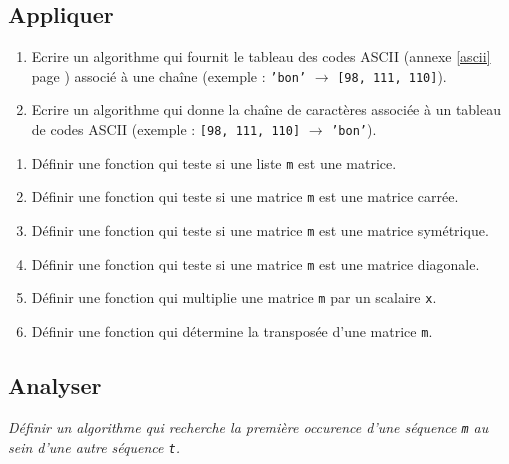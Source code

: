 \subsection{Appliquer}
\begin{td}\label{td:asciichaines}
\em
\begin{enumerate}
\item Ecrire un algorithme qui fournit le tableau des codes ASCII
        (annexe \ref{ascii} page \pageref{ascii}) associé
        à une chaîne (exemple : {\tt 'bon'} $\rightarrow$ {\tt [98, 111, 110]}).
\item Ecrire un algorithme qui donne la chaîne de caractères associée à un tableau de codes
        ASCII (exemple : {\tt [98, 111, 110]} $\rightarrow$ {\tt 'bon'}).
\end{enumerate}
\end{td}

\begin{td}\label{td:matrices2}
\em
\begin{enumerate}
\item Définir une fonction qui teste si une liste {\tt m} est une matrice.
\item Définir une fonction qui teste si une matrice {\tt m} est une matrice carrée.
\item Définir une fonction qui teste si une matrice {\tt m} est une matrice symétrique.
\item Définir une fonction qui teste si une matrice {\tt m} est une matrice diagonale.
\item Définir une fonction qui multiplie une matrice {\tt m} par un scalaire {\tt x}.
\item Définir une fonction qui détermine la transposée d'une matrice {\tt m}.
\end{enumerate}
\end{td}

\subsection{Analyser}
\begin{td}\label{td:motif}
\em
Définir un algorithme qui recherche la première occurence d'une séquence {\tt m}
au sein d'une autre séquence {\tt t}.
\end{td}

